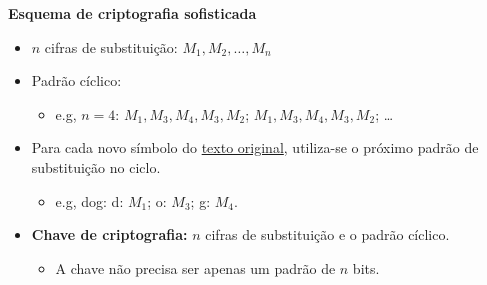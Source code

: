     \textbf{Esquema de criptografia sofisticada}
    \begin{itemize}[left=0.5cm, align=left, nosep]    
        \item $n$ cifras de substituição: $M_1, M_2,\ldots, M_n$
        \item Padrão cíclico:
        \begin{itemize}[left=0.5cm, nosep, label=$\hookrightarrow$]
            \item e.g, $n = 4$: $M_1, M_3, M_4, M_3, M_2$; $M_1, M_3, M_4, M_3, M_2$; \ldots
        \end{itemize}     
        \item Para cada novo símbolo do \underline{texto original}, utiliza-se o próximo padrão de substituição no ciclo.
        \begin{itemize}[left=0.5cm, nosep, label=$\hookrightarrow$]
            \item e.g, dog: d: $M_1$; o: $M_3$; g: $M_4$.
        \end{itemize} 
        \item \textbf{Chave de criptografia:} $n$ cifras de substituição e o padrão cíclico.
        \begin{itemize}[left=0.5cm, nosep, label=$\hookrightarrow$]
            \item A chave não precisa ser apenas um padrão de $n$ bits.
        \end{itemize} 
    \end{itemize}  

